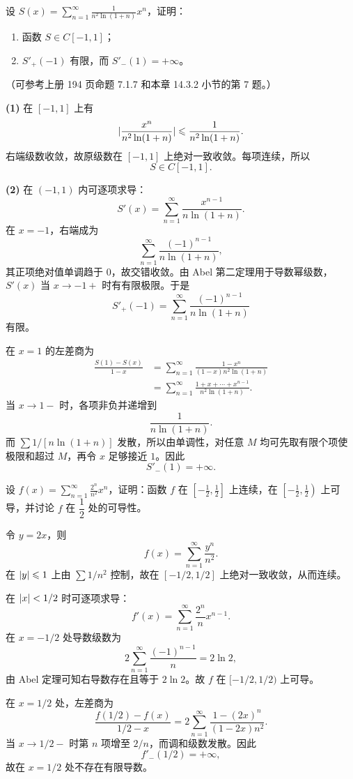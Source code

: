 \begin{xexercise}[9]
设 $\displaystyle S(x)=\sum_{n=1}^{\infty}\frac1{n^2\ln(1+n)}x^n$，证明：
  \begin{enumerate}[label=(\arabic*)]
    \item 函数 $S\in C[-1,1]$；
    \item $S'_+(-1)$ 有限，而 $S'_-(1)=+\infty$。
  \end{enumerate}
  （可参考上册 194 页命题 7.1.7 和本章 14.3.2 小节的第 7 题。）
\end{xexercise}
\begin{xsolution}
\textbf{(1)} 在 $[-1,1]$ 上有
\[
  \lvert\frac{x^n}{n^2\ln(1+n)}\rvert
  \leqslant\frac1{n^2\ln(1+n)}.
\]
右端级数收敛，故原级数在 $[-1,1]$ 上绝对一致收敛。每项连续，所以
\[
  S\in C[-1,1].
\]

\textbf{(2)} 在 $(-1,1)$ 内可逐项求导：
\[
  S'(x)=\sum_{n=1}^{\infty}\frac{x^{n-1}}{n\ln(1+n)}.
\]
在 $x=-1$，右端成为
\[
  \sum_{n=1}^{\infty}\frac{(-1)^{n-1}}{n\ln(1+n)},
\]
其正项绝对值单调趋于 $0$，故交错收敛。由 Abel 第二定理用于导数幂级数，$S'(x)$ 当 $x\to-1+$ 时有有限极限。于是
\[
  S'_+(-1)=\sum_{n=1}^{\infty}\frac{(-1)^{n-1}}{n\ln(1+n)}
\]
有限。

在 $x=1$ 的左差商为
\[
\begin{aligned}
  \frac{S(1)-S(x)}{1-x}
  &=\sum_{n=1}^{\infty}
    \frac{1-x^n}{(1-x)n^2\ln(1+n)}\\
  &=\sum_{n=1}^{\infty}
    \frac{1+x+\cdots+x^{n-1}}{n^2\ln(1+n)}.
\end{aligned}
\]
当 $x\to1-$ 时，各项非负并递增到
\[
  \frac1{n\ln(1+n)}.
\]
而 $\sum1/[n\ln(1+n)]$ 发散，所以由单调性，对任意 $M$ 均可先取有限个项使极限和超过 $M$，再令 $x$ 足够接近 $1$。因此
\[
  S'_-(1)=+\infty.
\]
\end{xsolution}


\begin{xexercise}[10]
设 $\displaystyle f(x)=\sum_{n=1}^{\infty}\frac{2^n}{n^2}x^n$，证明：函数 $f$ 在 $\left[-\frac12,\frac12\right]$ 上连续，在 $\left[-\frac12,\frac12\right)$ 上可导，并讨论 $f$ 在 $\dfrac12$ 处的可导性。
\end{xexercise}
\begin{xsolution}
令 $y=2x$，则
\[
  f(x)=\sum_{n=1}^{\infty}\frac{y^n}{n^2}.
\]
在 $\lvert y\rvert\leqslant1$ 上由 $\sum1/n^2$ 控制，故在 $[-1/2,1/2]$ 上绝对一致收敛，从而连续。

在 $\lvert x\rvert<1/2$ 时可逐项求导：
\[
  f'(x)=\sum_{n=1}^{\infty}\frac{2^n}{n}x^{n-1}.
\]
在 $x=-1/2$ 处导数级数为
\[
  2\sum_{n=1}^{\infty}\frac{(-1)^{n-1}}n=2\ln2,
\]
由 Abel 定理可知右导数存在且等于 $2\ln2$。故 $f$ 在 $[-1/2,1/2)$ 上可导。

在 $x=1/2$ 处，左差商为
\[
  \frac{f(1/2)-f(x)}{1/2-x}
  =2\sum_{n=1}^{\infty}\frac{1-(2x)^n}{(1-2x)n^2}.
\]
当 $x\to1/2-$ 时第 $n$ 项增至 $2/n$，而调和级数发散。因此
\[
  f'_-(1/2)=+\infty,
\]
故在 $x=1/2$ 处不存在有限导数。
\end{xsolution}


